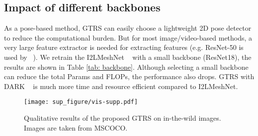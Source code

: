\documentclass[sigconf]{acmart}
\begin{document}
\subsection{Impact of different backbones}
As a pose-based method, GTRS can easily choose a lightweight 2D pose detector to reduce the computational burden. But for most image/video-based methods, a very large feature extractor is needed for extracting features (e.g. ResNet-50 is used by ~\cite{TCMR_Choi_2021,kocabas2020vibe,Kolotouros2019SPIN}). We retrain the I2LMeshNet ~\cite{Moon_I2L_MeshNet} with a small backbone (ResNet18), the results are shown in Table \ref{tab: backbone}. Although selecting a small backbone can reduce the total Params and FLOPs, the performance also drops. GTRS with DARK ~\cite{darkpose_2020} is much more time and resource efficient compared to I2LMeshNet.


\begin{table}[htp]
\tiny
\centering
  \caption{ Impact of different backbones. Results are evaluated on 3DPW dataset.}
\label{tab: backbone}
\vspace{-5pt}
\end{table}

\begin{figure*}[htp]
\vspace{-5pt}
  \centering
  \texttt{[image: sup\_figure/vis-supp.pdf]}
  \vspace{-5pt}
  \caption{Qualitative results of the proposed GTRS on in-the-wild images. Images are taken from MSCOCO\cite{lin2014mscoco}. }
  \label{fig:vis_all}
  \vspace{-5pt}
\end{figure*}
\end{document}
